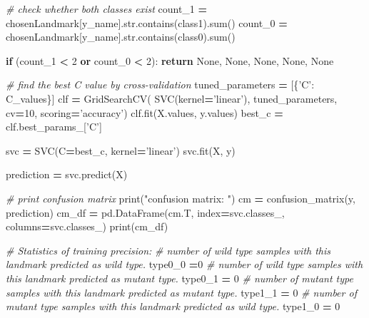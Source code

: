\documentclass[10pt,letterpaper]{article}
\newenvironment{Shaded}{\begin{snugshade}}{\end{snugshade}}
\newcommand{\KeywordTok}[1]{\textcolor[rgb]{0.13,0.29,0.53}{\textbf{#1}}}
\newcommand{\DecValTok}[1]{\textcolor[rgb]{0.00,0.00,0.81}{#1}}
\newcommand{\StringTok}[1]{\textcolor[rgb]{0.31,0.60,0.02}{#1}}
\newcommand{\CommentTok}[1]{\textcolor[rgb]{0.56,0.35,0.01}{\textit{#1}}}
\newcommand{\VariableTok}[1]{\textcolor[rgb]{0.00,0.00,0.00}{#1}}
\newcommand{\ControlFlowTok}[1]{\textcolor[rgb]{0.13,0.29,0.53}{\textbf{#1}}}
\newcommand{\OperatorTok}[1]{\textcolor[rgb]{0.81,0.36,0.00}{\textbf{#1}}}
\newcommand{\BuiltInTok}[1]{#1}
\newcommand{\NormalTok}[1]{#1}
\begin{document}
\begin{Shaded}
\begin{Highlighting}[]
    \CommentTok{# check whether both classes exist}
\NormalTok{    count_1 }\OperatorTok{=}\NormalTok{ chosenLandmark[y_name].}\BuiltInTok{str}\NormalTok{.contains(class1).}\BuiltInTok{sum}\NormalTok{()}
\NormalTok{    count_0 }\OperatorTok{=}\NormalTok{ chosenLandmark[y_name].}\BuiltInTok{str}\NormalTok{.contains(class0).}\BuiltInTok{sum}\NormalTok{()}

    \ControlFlowTok{if}\NormalTok{ (count_1 }\OperatorTok{<} \DecValTok{2} \KeywordTok{or}\NormalTok{ count_0 }\OperatorTok{<} \DecValTok{2}\NormalTok{):}
        \ControlFlowTok{return} \VariableTok{None}\NormalTok{, }\VariableTok{None}\NormalTok{, }\VariableTok{None}\NormalTok{, }\VariableTok{None}\NormalTok{, }\VariableTok{None}

    \CommentTok{# find the best C value by cross-validation}
\NormalTok{    tuned_parameters }\OperatorTok{=}\NormalTok{ [\{}\StringTok{'C'}\NormalTok{: C_values\}]}
\NormalTok{    clf }\OperatorTok{=}\NormalTok{ GridSearchCV(}
\NormalTok{        SVC(kernel}\OperatorTok{=}\StringTok{'linear'}\NormalTok{), tuned_parameters, cv}\OperatorTok{=}\DecValTok{10}\NormalTok{, scoring}\OperatorTok{=}\StringTok{'accuracy'}\NormalTok{)}
\NormalTok{    clf.fit(X.values, y.values)}
\NormalTok{    best_c }\OperatorTok{=}\NormalTok{ clf.best_params_[}\StringTok{'C'}\NormalTok{]}
    
\NormalTok{    svc }\OperatorTok{=}\NormalTok{ SVC(C}\OperatorTok{=}\NormalTok{best_c, kernel}\OperatorTok{=}\StringTok{'linear'}\NormalTok{)}
\NormalTok{    svc.fit(X, y)}
    
\NormalTok{    prediction }\OperatorTok{=}\NormalTok{ svc.predict(X)}

    \CommentTok{# print confusion matrix}
    \BuiltInTok{print}\NormalTok{(}\StringTok{"confusion matrix: "}\NormalTok{)}
\NormalTok{    cm }\OperatorTok{=}\NormalTok{ confusion_matrix(y, prediction)}
\NormalTok{    cm_df }\OperatorTok{=}\NormalTok{ pd.DataFrame(cm.T, index}\OperatorTok{=}\NormalTok{svc.classes_, columns}\OperatorTok{=}\NormalTok{svc.classes_)}
    \BuiltInTok{print}\NormalTok{(cm_df)}

    \CommentTok{# Statistics of training precision:}
    \CommentTok{# number of wild type samples with this landmark predicted as wild type.}
\NormalTok{    type0_0 }\OperatorTok{=}\DecValTok{0}
    \CommentTok{# number of wild type samples with this landmark predicted as mutant type.}
\NormalTok{    type0_1 }\OperatorTok{=} \DecValTok{0}
    \CommentTok{# number of mutant type samples with this landmark predicted as mutant type.}
\NormalTok{    type1_1 }\OperatorTok{=} \DecValTok{0}
    \CommentTok{# number of mutant type samples with this landmark predicted as wild type.}
\NormalTok{    type1_0 }\OperatorTok{=} \DecValTok{0}
    

\end{Highlighting}
\end{Shaded}
\end{document}
